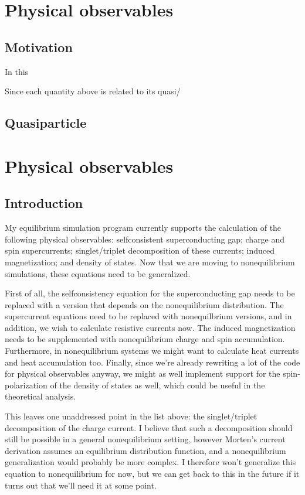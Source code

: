 \chapter{Physical observables}
\section{Motivation}
In this 

Since each quantity above is related to its quasi/

\section{Quasiparticle }



\chapter{Physical observables}
\section{Introduction}
My equilibrium simulation program currently supports the calculation of the following physical observables:
  selfconsistent superconducting gap;
  charge and spin supercurrents;
  singlet/triplet decomposition of these currents;
  induced magnetization;
  and density of states.
Now that we are moving to nonequilibrium simulations, these equations need to be generalized.

First of all, the selfconsistency equation for the superconducting gap needs to be replaced with a version that depends on the nonequilibrium distribution.
The supercurrent equations need to be replaced with nonequilbrium versions, and in addition, we wish to calculate resistive currents now.
The induced magnetization needs to be supplemented with nonequilibrium charge and spin accumulation.
Furthermore, in nonequilibrium systems we might want to calculate heat currents and heat accumulation too.
Finally, since we're already rewriting a lot of the code for physical observables anyway, we might as well implement support for the spin-polarization of the density of states as well, which could be useful in the theoretical analysis.

This leaves one unaddressed point in the list above: the singlet/triplet decomposition of the charge current.
I believe that such a decomposition should still be possible in a general nonequilibrium setting, however Morten's current derivation assumes an equilibrium distribution function, and a nonequilibrium generalization would probably be more complex.
I therefore won't generalize this equation to nonequilibrium for now, but we can get back to this in the future if it turns out that we'll need it at some point.

